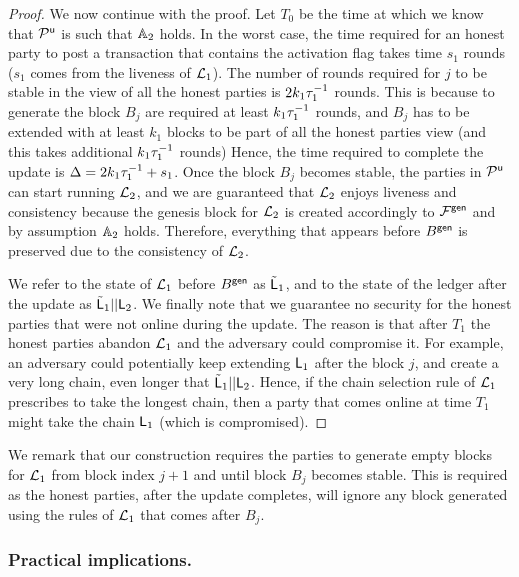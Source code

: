 \begin{proof}
We now continue with the proof.
Let $T_0$ be the time at which we know that  $\mathcal{P}^\mathsf{u}$ is such that $\mathbb{A}_2$ holds.
In the worst case, the time required for an honest party to post a transaction that 
contains the activation flag takes time $s_1$ rounds ($s_1$ comes from
the liveness of $\mathcal{L}_1$).
The number of rounds required for $j$ to be stable in the view of all the honest parties is 
 $2k_1\tau_1^{-1}$ rounds. This is because to generate the block $B_j$ are required at least $k_1\tau_1^{-1}$ 
 rounds, and $B_j$ has to be extended with at least $k_1$ blocks to be part of all the honest parties view (and this takes additional $k_1\tau_1^{-1}$ rounds) 
  Hence, the time required to complete the update is $\Delta=2k_1 \tau_1^{-1}+s_1$.
 Once the block $B_j$ becomes stable, the parties in $\mathcal{P}^\mathsf{u}$ can start running $\mathcal{L}_2$, and 
 we are guaranteed that $\mathcal{L}_2$ enjoys liveness and consistency because the genesis block
 for $\mathcal{L}_2$ is created accordingly to $\mathcal{F}^\mathsf{gen}$ and by assumption $\mathbb{A}_2$ holds.
  Therefore, everything that appears before $B^\mathsf{gen}$ is preserved due to the consistency of 
 $\mathcal{L}_2$. 
 
 We refer to the state of $\mathcal{L}_1$ before $B^\mathsf{gen}$ as $\tilde {\mathsf{L}}_1$, and to the state
 of the ledger after the update as $\tilde {\mathsf{L}}_1||\mathsf{L}_2$.
 We finally note that we guarantee no security for the honest parties that were not online during the update.
 The reason is that after $T_1$ the honest parties abandon $\mathcal{L}_1$ and the adversary could compromise it.
 For example, an adversary could potentially keep extending $\mathsf{L}_1$ after the block $j$, and 
 create a very long chain, even longer that $\tilde {\mathsf{L}}_1||\mathsf{L}_2$. Hence, if the chain selection rule of
 $\mathcal{L}_1$ prescribes to take the longest chain, then a party that comes online at time $T_1$ might take
 the chain $\mathsf{L}_1$ (which is compromised). 
 
\end{proof}


We remark that our construction requires the parties to generate empty blocks for $\mathcal{L}_1$ from block index $j+1$ and until block $B_j$ becomes stable. This is required as the honest parties, after the update completes, will ignore any block generated using the rules of $\mathcal{L}_1$ that comes after 
$B_j$. 





\subsubsection{Practical implications.}

